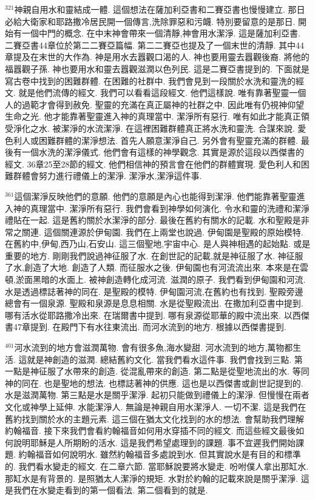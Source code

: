 \documentclass{book}
\begin{document}
$^{321}$神親自用水和靈結成一體.
這個想法在薩加利亞書和二賽亞書也慢慢建立.
那日必給大衛家和耶路撒冷居民開一個傳言,洗除罪惡和污衊.
特別要留意的是那日.
開始有一個中門的概念.
在中末神會帶來一個清靜,神會用水潔淨.
這是薩加利亞書.
二賽亞書44章位於第二二賽亞篇幅.
第二二賽亞也提及了一個末世的清靜.
其中44章提及在末世的大作為.
神是用水去囂觀口渴的人.
神也要用靈去囂觀後裔.
將他的福囂觀子孫.
神也要用水和靈去囂觀滋潤以色列民.
這是二賽亞書提到的.
下面就是寫古卷中找到的困難群體.
在困難的社群中.
我們會見到一段關於水洗和靈洗的經文.
就是他們流傳的經文.
我們可以看看這段經文.
他們這樣說.
唯有靠著聖靈一個人的過範才會得到赦免.
聖靈的充滿在真正屬神的社群之中.
因此唯有仍視神仰望生命之光.
他才能靠著聖靈進入神的真理當中.
潔淨所有惡行.
唯有如此才能真正領受淨化之水.
被潔淨的水流潔淨.
在這裡困難群體真正將水洗和靈洗.
合謀來說.
愛色利人或困難群體的潔淨想法.
首先人願意潔淨自己.
另外會有聖靈充滿的群體.
最後有一個水洗的潔淨儀式.
他們會有這樣的神學觀念.
其實是源於這段以西傑書的經文.
36章25至28節的經文.
他們相信神的預言會在他們的群體實現.
愛色利人和困難群體會努力進行禮儀上的潔淨.
潔淨水,潔淨這件事.

$^{361}$這個潔淨反映他們的意願.
他們的意願是內心也能得到潔淨.
他們能靠著聖靈進入神的真理當中.
潔淨所有惡行.
我們會看到神學如何演化.
令水和靈的洗禮和潔淨禮貼在一起.
這是舊約關於水潔淨的部分.
最後在舊約有關水的記載.
水和聖殿是非常之關連.
這個關連源於伊甸園.
我們在上兩堂也說過.
伊甸園是聖殿的原始模特.
在舊約中,伊甸,西乃山,石安山.
這三個聖地,宇宙中心.
是人與神相遇的起始點.
或是重要的地方.
剛剛我們說過神征服了水.
在創世記的記載,就是神征服了水.
神征服了水,創造了大地.
創造了人類.
而征服水之後.
伊甸園也有河流流出來.
本來是在雲頓,淤面黑暗的水面上.
被神創造轉化成河流.
滋潤的原子.
我們看到伊甸園和河流.
水是透過標誌著神的同在.
是聖殿的模特.
伊甸園河流,在舊約也有找到.
聖殿旁邊總會有一個泉源.
聖殿和泉源是息息相關.
水是從聖殿流出.
在撒加利亞書中提到.
哪有活水從耶路撒冷出來.
在瑞爾書中提到.
哪有泉源從耶華的殿中流出來.
以西傑書47章提到.
在殿門下有水往東流出.
而河水流到的地方.
根據以西傑書提到.

$^{401}$河水流到的地方會滋潤萬物.
會有很多魚,海水變甜.
河水流到的地方,萬物都生活.
這就是神創造的滋潤.
總結舊約文化.
當我們看水這件事.
我們會找到三點.
第一點是神征服了水帶來的創造.
從混亂帶來的創造.
第二點是從聖地流出的水.
等同神的同在.
也是聖地的想法.
也標誌著神的供應.
這也是以西傑書或創世記提到的.
水是滋潤萬物.
第三點是水是關乎潔淨.
起初只能做到禮儀上的潔淨.
但慢慢在兩者文化或神學上延伸.
水能潔淨人.
無論是神親自用水潔淨人.
一切不潔.
這是我們在舊約找到關於水的主題元素.
這三個在猶太文化找到的水的想法.
會幫助我們理解約翰福音.
接下來我們會看約翰福音如何用水穿插不同的經文.
而這些經文最後如何說明耶穌是人所期盼的活水.
這是我們希望處理到的課題.
事不宜遲我們開始課題.
約翰福音如何說明水.
雖然約翰福音多處說到水.
但其實說水是有目的和標準的.
我們看水變走的經文.
在二章六節.
當耶穌說要將水變走.
吩咐僕人拿出那缸水.
那缸水是有背景的.
是照猶太人潔淨的規矩.
水對於約翰的記載來說是關乎潔淨.
這是我們在水變走看到的第一個看法.
第二個看到的就是.
\end{document}
